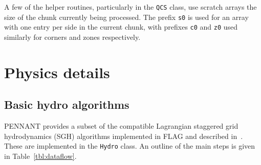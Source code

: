 \documentclass[11pt,letterpaper]{article} %
\begin{document}
A few of the helper routines, particularly in the {\tt QCS} class,
use scratch arrays the size of the chunk currently being processed.
The prefix {\tt s0} is used for an array with one entry per side
in the current chunk, with prefixes {\tt c0} and {\tt z0} used similarly
for corners and zones respectively.

\section{Physics details}

\subsection{Basic hydro algorithms}

PENNANT provides a subset of the compatible Lagrangian staggered grid
hydrodynamics (SGH) algorithms implemented in FLAG and described
in~\cite{hydro}.  These are implemented in the {\tt Hydro} class.
An outline of the main steps is given in Table~\ref{tbl:dataflow}.

\def\RR{\raggedright}
\end{document}
